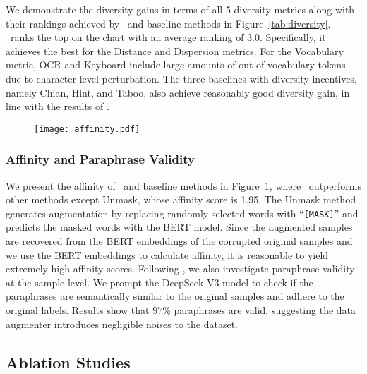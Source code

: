 We demonstrate the diversity gains in terms of all 5 diversity metrics along with their rankings achieved by \Methodnamec~and baseline methods in Figure~\ref{tab:diversity}. 
\Methodnamec~ranks the top on the chart with an average ranking of 3.0. Specifically, it achieves the best for the Distance and Dispersion metrics. For the Vocabulary metric, OCR and Keyboard include large amounts of out-of-vocabulary tokens due to character level perturbation. The three baselines with diversity incentives, namely Chian, Hint, and Taboo, also achieve reasonably good diversity gain, in line with the results of \cite{cegin2024effects}.

\begin{figure}[t]
    \centering
    \texttt{[image: affinity.pdf]}
    \vspace{-4mm}
    \label{fig:affinity}
\end{figure}

\vspace{-1.5mm}
\subsubsection{Affinity and Paraphrase Validity}
\vspace{-1.5mm}


We present the affinity of \Methodnamec~and baseline methods in Figure~\ref{fig:affinity}, where \Methodnamea~outperforms other methods except Unmask, whose affinity score is 1.95. The Unmask method generates augmentation by replacing randomly selected words with ``\texttt{[MASK]}'' and predicts the masked words with the BERT model. Since the augmented samples are recovered from the BERT embeddings of the corrupted original samples and we use the BERT embeddings to calculate affinity, it is reasonable to yield extremely high affinity scores. 
Following \cite{cegin2023chatgpt,cegin2024effects}, we also investigate paraphrase validity at the sample level. We prompt the DeepSeek-V3 model to check if the paraphrases are semantically similar to the original samples and adhere to the original labels. Results show that \(97\%\) paraphrases are valid, suggesting the data augmenter introduces negligible noises to the dataset. 




\vspace{-2mm}
\subsection{Ablation Studies}
\vspace{-2mm}

